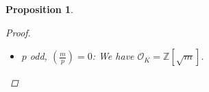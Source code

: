 \documentclass[11pt]{article}
\newtheorem{prop}{Proposition}
\theoremstyle{definition}
\begin{document}
\begin{prop}
\begin{proof}
            \begin{itemize}
                \item $p$ odd, $\left( \frac{m}{p} \right) = 0$: We have $\mathcal{O}_K = \mathbb{Z}\left[\sqrt {m}\right]$.
            \end{itemize}

        \end{proof}
    \end{prop}
\end{document}
